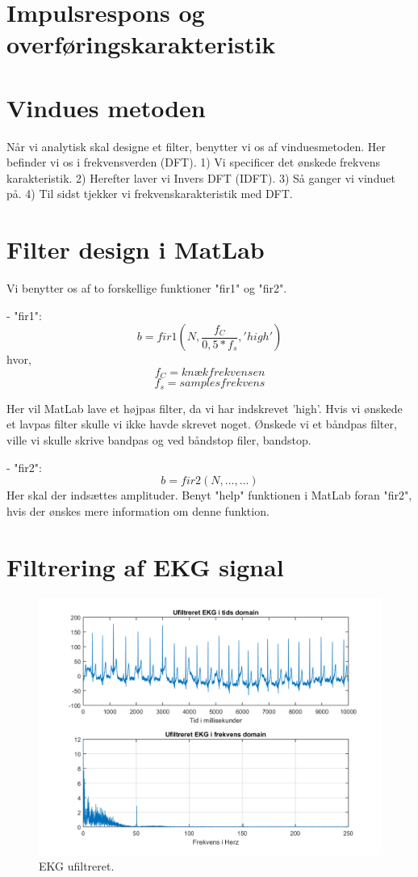 \documentclass[12pt, letterpaper]{article}
\begin{document}
\section{Impulsrespons og overføringskarakteristik}


\section{Vindues metoden}
Når vi analytisk skal designe et filter, benytter vi os af vinduesmetoden. Her befinder vi os i frekvensverden (DFT). 
1) Vi specificer det ønskede frekvens karakteristik.
2) Herefter laver vi Invers DFT (IDFT). 
3) Så ganger vi vinduet på. 
4) Til sidst tjekker vi frekvenskarakteristik med DFT. 
 
\section{Filter design i MatLab}
Vi benytter os af to forskellige funktioner "fir1" og "fir2". 

- "fir1": 
$$ b = fir1(N, \frac{f_C}{0,5*f_s}, 'high') $$ 
hvor, 
$$ f_C = knækfrekvensen $$
$$ f_s = samplesfrekvens $$

Her vil MatLab lave et højpas filter, da vi har indskrevet 'high'. 
Hvis vi ønskede et lavpas filter skulle vi ikke havde skrevet noget. Ønskede vi et båndpas filter, ville vi skulle skrive bandpas og ved båndstop filer, bandstop. 

- "fir2": 
$$ b = fir2(N, ..., ...) $$
Her skal der indsættes amplituder. Benyt "help" funktionen i MatLab foran "fir2", hvis der ønskes mere information om denne funktion. 


\section{Filtrering af EKG signal}

\begin{figure}[!h]
           \includegraphics[width=\linewidth]{billeder/EKGufiltreret}	   							\caption{EKG ufiltreret.}
\end{figure}
\end{document}
